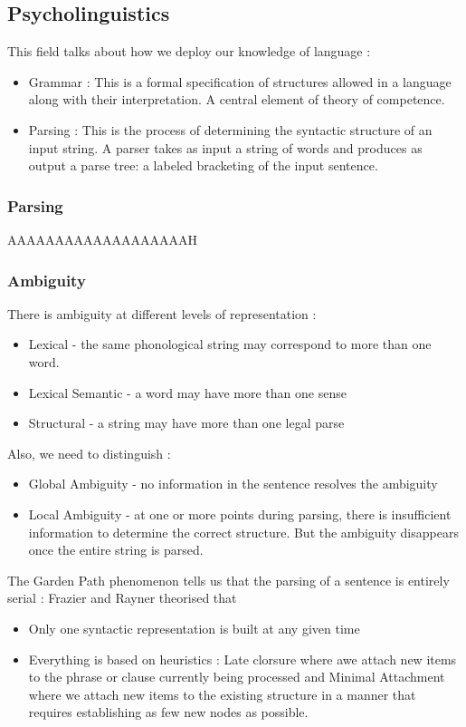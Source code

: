 \documentclass{cours}
\begin{document}
\subsection{Psycholinguistics}
This field talks about how we deploy our knowledge of language : 
\begin{itemize}
    \item Grammar : This is a formal specification of structures allowed in a language along with their interpretation. A central element of theory of competence. 
    \item Parsing : This is the process of determining the syntactic structure of an input string. A parser takes as input a string of words and produces as output a parse tree: a labeled bracketing of the input sentence. 
\end{itemize}

\subsubsection{Parsing}
AAAAAAAAAAAAAAAAAAAH 

\subsubsection{Ambiguity}
There is ambiguity at different levels of representation : 
\begin{itemize}
    \item Lexical - the same phonological string may correspond to more than one word.
    \item Lexical Semantic - a word may have more than one sense
    \item Structural - a string may have more than one legal parse
\end{itemize}
Also, we need to distinguish : 
\begin{itemize}
    \item Global Ambiguity - no information in the sentence resolves the ambiguity
    \item Local Ambiguity - at one or more points during parsing, there is insufficient information to determine the correct structure. But the ambiguity disappears once the entire string is parsed. 
\end{itemize}
The Garden Path phenomenon tells us that the parsing of a sentence is entirely serial : Frazier and Rayner theorised that
\begin{itemize}
    \item Only one syntactic representation is built at any given time
    \item Everything is based on heuristics : Late clorsure where awe attach new items to the phrase or clause currently being processed and Minimal Attachment where we attach new items to the existing structure in a manner that requires establishing as few new nodes as possible.
\end{itemize}
\end{document}
